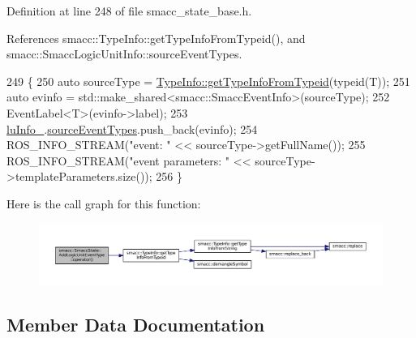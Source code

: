 Definition at line 248 of file smacc\+\_\+state\+\_\+base.\+h.



References smacc\+::\+Type\+Info\+::get\+Type\+Info\+From\+Typeid(), and smacc\+::\+Smacc\+Logic\+Unit\+Info\+::source\+Event\+Types.


\begin{DoxyCode}
249     \{
250       \textcolor{keyword}{auto} sourceType = \hyperlink{classsmacc_1_1TypeInfo_a9d871ecc7a19983b37afca0cd219a5f8}{TypeInfo::getTypeInfoFromTypeid}(\textcolor{keyword}{typeid}(T));
251       \textcolor{keyword}{auto} evinfo = std::make\_shared<smacc::SmaccEventInfo>(sourceType);
252       EventLabel<T>(evinfo->label);
253       \hyperlink{structsmacc_1_1SmaccState_1_1AddLogicUnitEventType_a31c27ea945cd0127080c0bae872c028e}{luInfo\_}.\hyperlink{structsmacc_1_1SmaccLogicUnitInfo_ab753c234942c41eb973873f9222b9fd9}{sourceEventTypes}.push\_back(evinfo);
254       ROS\_INFO\_STREAM(\textcolor{stringliteral}{"event: "} << sourceType->getFullName());
255       ROS\_INFO\_STREAM(\textcolor{stringliteral}{"event parameters: "} << sourceType->templateParameters.size());
256     \}
\end{DoxyCode}


Here is the call graph for this function\+:
\nopagebreak
\begin{figure}[H]
\begin{center}
\leavevmode
\includegraphics[width=350pt]{structsmacc_1_1SmaccState_1_1AddLogicUnitEventType_a8ed7e96e4922fbc8097a6ff078d70150_cgraph}
\end{center}
\end{figure}




\subsection{Member Data Documentation}

